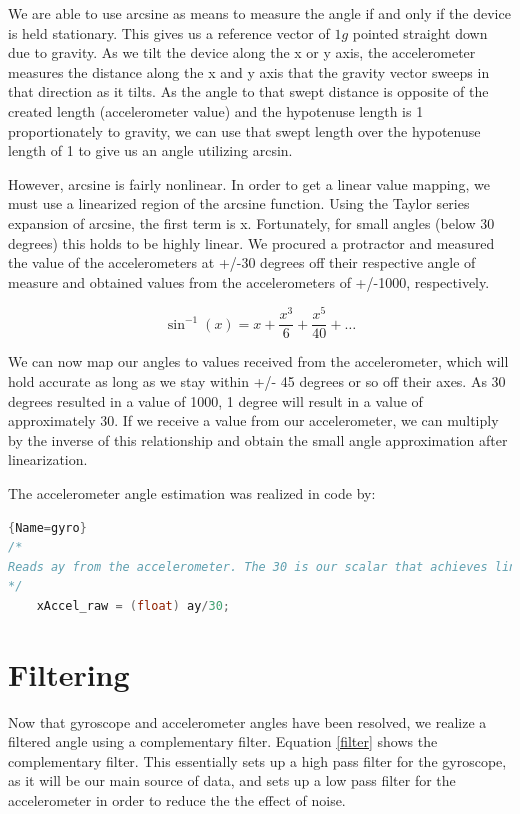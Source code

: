 \documentclass{IEEEtran}
\begin{document}
We are able to use arcsine as means to measure the angle if and only if the device is held stationary. This gives us a reference vector of $1 g$ pointed straight down due to gravity. As we tilt the device along the x or y axis, the accelerometer measures the distance along the x and y axis that the gravity vector sweeps in that direction as it tilts. As the angle to that swept distance is opposite of the created length (accelerometer value) and the hypotenuse length is 1 proportionately to gravity, we can use that swept length over the hypotenuse length of 1 to give us an angle utilizing arcsin.


However, arcsine is fairly nonlinear. In order to get a linear value mapping, we must use a linearized region of the arcsine function. Using the Taylor series expansion of arcsine, the first term is x. Fortunately, for small angles (below 30 degrees) this holds to be highly linear.  We procured a protractor and measured the value of the accelerometers at +/-30 degrees off their respective angle of measure and obtained values from the accelerometers of +/-1000, respectively.

\begin{equation}
\label{taylor}
\sin^{-1}(x)=x+\frac{x^3}{6}+\frac{x^5}{40}+\ldots
\end{equation}



We can now map our angles to values received from the accelerometer, which will hold accurate as long as we stay within +/- 45 degrees or so off their axes. As 30 degrees resulted in a value of 1000, 1 degree will result in a value of approximately 30. If we receive a value from our accelerometer, we can multiply by the inverse of this relationship and obtain the small angle approximation after linearization.

The accelerometer angle estimation was realized in code by:
\begin{lstlisting}[language=C++]{Name=gyro}
/*
Reads ay from the accelerometer. The 30 is our scalar that achieves linearization.
*/
    xAccel_raw = (float) ay/30;
\end{lstlisting}

\section{Filtering}
Now that gyroscope and accelerometer angles have been resolved, we realize a filtered angle using a complementary filter. Equation \ref{filter} shows the complementary filter. This essentially sets up a high pass filter for the gyroscope, as it will be our main source of data, and sets up a low pass filter for the accelerometer in order to reduce the the effect of noise.
\end{document}
